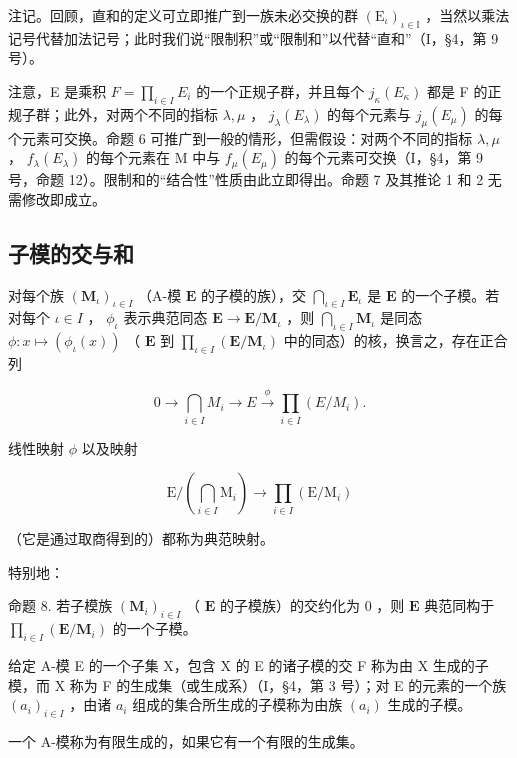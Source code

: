注记。回顾，直和的定义可立即推广到一族未必交换的群 \((\mathrm{E}_{\iota})_{\iota\in\mathbb{I}}\) ，当然以乘法记号代替加法记号；此时我们说“限制积”或“限制和”以代替“直和”（I，§4，第 9 号）。

注意，E 是乘积 \(F = \prod_{i \in I} E_{i}\) 的一个正规子群，并且每个 \(j_{\kappa}(E_{\kappa})\) 都是 F 的正规子群；此外，对两个不同的指标 \(\lambda, \mu\) ， \(j_{\lambda}(E_{\lambda})\) 的每个元素与 \(j_{\mu}(E_{\mu})\) 的每个元素可交换。命题 6 可推广到一般的情形，但需假设：对两个不同的指标 \(\lambda, \mu\) ， \(f_{\lambda}(E_{\lambda})\) 的每个元素在 M 中与 \(f_{\mu}(E_{\mu})\) 的每个元素可交换（I，§4，第 9 号，命题 12）。限制和的“结合性”性质由此立即得出。命题 7 及其推论 1 和 2 无需修改即成立。

\subsection{子模的交与和}

对每个族 \((\mathbf{M}_{\iota})_{\iota \in I}\) （A-模 \(\mathbf{E}\) 的子模的族），交 \(\bigcap_{\iota \in I} \mathbf{E}_{\iota}\) 是 \(\mathbf{E}\) 的一个子模。若对每个 \(\iota \in I\) ， \(\phi_{\iota}\) 表示典范同态 \(\mathbf{E} \to \mathbf{E} / \mathbf{M}_{\iota}\) ，则 \(\bigcap_{\iota \in I} \mathbf{M}_{\iota}\) 是同态 \(\phi: x \mapsto (\phi_{\iota}(x))\) （ \(\mathbf{E}\) 到 \(\prod_{\iota \in I} (\mathbf{E} / \mathbf{M}_{\iota})\) 中的同态）的核，换言之，存在正合列

\[
0 \longrightarrow \bigcap_ {i \in I} M _ {i} \longrightarrow E \stackrel {\phi} {\longrightarrow} \prod_ {i \in I} (E / M _ {i}).\tag{27}
\]

线性映射 \(\phi\) 以及映射

\[
\mathrm{E} / \left(\bigcap_ {i \in I} \mathrm{M} _ {i}\right)\rightarrow \prod_ {i \in I} (\mathrm{E} / \mathrm{M} _ {i})
\]

（它是通过取商得到的）都称为典范映射。

特别地：

命题 8. 若子模族 \((\mathbf{M}_i)_{i\in I}\) （ \(\mathbf{E}\) 的子模族）的交约化为 0 ，则 \(\mathbf{E}\) 典范同构于 \(\prod_{i\in I}(\mathbf{E}/\mathbf{M}_i)\) 的一个子模。

给定 A-模 E 的一个子集 X，包含 X 的 E 的诸子模的交 F 称为由 X 生成的子模，而 X 称为 F 的生成集（或生成系）（I，§4，第 3 号）；对 E 的元素的一个族 \((a_{i})_{i\in I}\) ，由诸 \(a_{i}\) 组成的集合所生成的子模称为由族 \((a_{i})\) 生成的子模。

一个 A-模称为有限生成的，如果它有一个有限的生成集。

